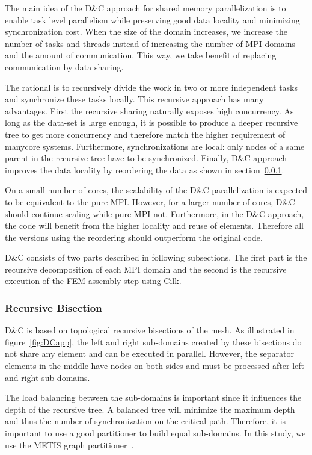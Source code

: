 \documentclass[10pt]{IOS-Book-Article}
\begin{document}
The main idea of the D\&C approach for shared memory parallelization is to enable task level parallelism while preserving good data locality and minimizing synchronization cost.
When the size of the domain increases, we increase the number of tasks and threads instead of increasing the number of MPI domains and the amount of communication.
This way, we take benefit of replacing communication by data sharing.

The rational is to  recursively divide the work in two or more independent tasks and synchronize these tasks locally. This recursive approach has many advantages.
First the recursive sharing naturally exposes high concurrency. As long as the data-set is large enough, it is possible to produce a deeper recursive tree to get more concurrency and 
therefore match the higher requirement of manycore systems. Furthermore, synchronizations are local: only nodes of a same parent in the recursive tree have to be synchronized.
Finally, D\&C approach improves the data locality by reordering the data as shown in section~\ref{sec:DCrec}.

On a small number of cores, the scalability of the D\&C parallelization is expected to be equivalent to the pure MPI.
However, for a larger number of cores, D\&C should continue scaling while pure MPI not.
Furthermore, in the D\&C approach, the code will benefit from the higher locality and reuse of elements. Therefore all the versions using the reordering should outperform the original code.

D\&C consists of two parts described in following subsections.
The first part is the recursive decomposition of each MPI domain and the second is the recursive execution of the FEM assembly step using Cilk.

\subsubsection{Recursive Bisection}
\label{sec:DCrec}
D\&C is based on topological recursive bisections of the mesh.
As illustrated in figure~\ref{fig:DCapp}, the left and right sub-domains created by these bisections do not share any element and can be executed in parallel.
However, the separator elements in the middle have nodes on both sides and must be processed after left and right sub-domains.

The load balancing between the sub-domains is important since it influences the depth of the recursive tree.
A balanced tree will minimize the maximum depth and thus the number of synchronization on the critical path.
Therefore, it is important to use a good partitioner to build equal sub-domains. In this study, we use the METIS graph partitioner~\cite{Metis}.
\end{document}
